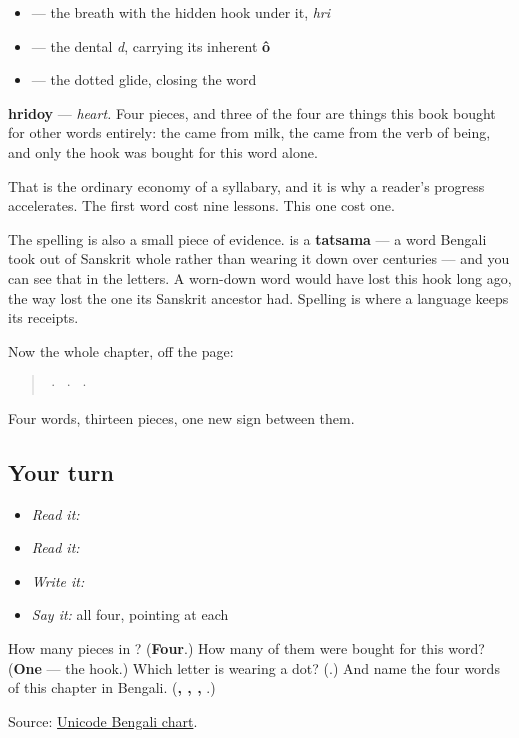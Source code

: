 \begin{itemize}
\raggedright
  \item \textbf{} — the breath with the hidden hook under it, \emph{hri}
  \item \textbf{} — the dental \emph{d}, carrying its inherent \textbf{ô}
  \item \textbf{} — the dotted glide, closing the word
\end{itemize}

\textbf{hridoy} — \emph{heart.} Four pieces, and three of the four are things this book bought for other words entirely: the \textbf{} came from milk, the \textbf{} came from the verb of being, and only the hook was bought for this word alone.

That is the ordinary economy of a syllabary, and it is why a reader's progress accelerates. The first word cost nine lessons. This one cost one.

The spelling is also a small piece of evidence. \textbf{} is a \textbf{tatsama} — a word Bengali took out of Sanskrit whole rather than wearing it down over centuries — and you can see that in the letters. A worn-down word would have lost this hook long ago, the way \textbf{} lost the one its Sanskrit ancestor had. Spelling is where a language keeps its receipts.

Now the whole chapter, off the page:

\begin{quote}
\textbf{} · \textbf{} · \textbf{} · \textbf{}
\end{quote}

Four words, thirteen pieces, one new sign between them.

\subsection*{Your turn}
\begin{itemize}
\raggedright
  \item \emph{Read it:} 
  \item \emph{Read it:}    
  \item \emph{Write it:} 
  \item \emph{Say it:} all four, pointing at each
\end{itemize}

\begin{tcolorbox}[breakable,colback=teal!4,colframe=teal!35!black,title={Before you move on}]
How many pieces in \textbf{}? (\textbf{Four}.) How many of them were bought for this word? (\textbf{One} — the hook.) Which letter is wearing a dot? (\textbf{}.) And name the four words of this chapter in Bengali. (\textbf{, , , }.)

Source: \href{https://www.unicode.org/charts/PDF/U0980.pdf}{Unicode Bengali chart}.
\end{tcolorbox}
